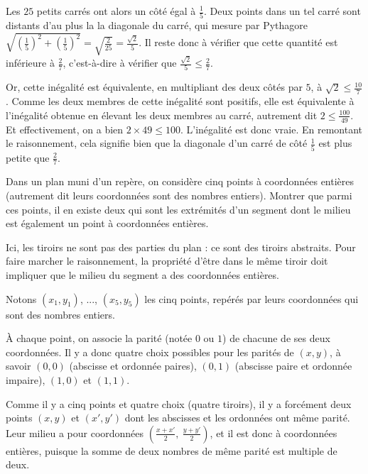 \begin{exo}
\begin{sol}
Les $25$ petits carrés ont alors un côté égal à $\frac15$. Deux points dans un tel carré sont distants d'au plus la la diagonale du carré, qui mesure par Pythagore $\sqrt{\left(\frac{1}{5}\right)^2+\left(\frac{1}{5}\right)^2} = \sqrt{\frac{2}{25}} = \frac{\sqrt 2}{5}$. Il reste donc à vérifier que cette quantité est inférieure à $\frac27$, c'est-à-dire à vérifier que $\frac{\sqrt 2}{5} \leq \frac27$.

Or, cette inégalité est équivalente, en multipliant des deux côtés par $5$, à $\sqrt 2 \leq \frac{10}{7}$. Comme les deux membres de cette inégalité sont positifs, elle est équivalente à l'inégalité obtenue en élevant les deux membres au carré, autrement dit $2\leq \frac{100}{49}$. Et effectivement, on a bien $2\times 49 \leq 100$. L'inégalité est donc vraie. En remontant le raisonnement, cela signifie bien que la diagonale d'un carré de côté $\frac15$ est plus petite que $\frac27$.
\end{sol}
\end{exo}

\begin{exo}
Dans un plan muni d'un repère, on considère cinq points à coordonnées entières  (autrement dit leurs coordonnées sont des nombres entiers). Montrer que parmi ces points, il en existe deux qui sont les extrémités  d'un segment dont le milieu est également un point à coordonnées entières.
\begin{hint}
Ici, les tiroirs ne sont pas des parties du plan : ce sont des tiroirs \og abstraits\fg. Pour faire marcher le raisonnement, la propriété d'être dans le même tiroir doit impliquer que le milieu du segment a des coordonnées entières.
\end{hint}
\begin{sol}
Notons $(x_1,y_1)$, ..., $(x_5,y_5)$ les cinq points, repérés par leurs coordonnées qui sont des nombres entiers.

À chaque point, on associe la parité (notée $0$ ou $1$) de chacune de ses deux coordonnées. Il y a donc quatre choix possibles pour les parités de $(x,y)$, à savoir $(0,0)$ (abscisse et ordonnée paires), $(0,1)$ (abscisse paire et ordonnée impaire), $(1,0)$ et $(1,1)$.

Comme il y a cinq points et quatre choix (quatre \og tiroirs\fg), il y a forcément deux points $(x,y)$ et $(x',y')$ dont les abscisses et les ordonnées ont même parité. Leur milieu a pour coordonnées $\left(\frac{x+x'}{2},\: \frac{y+y'}{2}\right)$, et il est donc à coordonnées entières, puisque la somme de deux nombres de même parité est multiple de deux.
\end{sol}
\end{exo}

